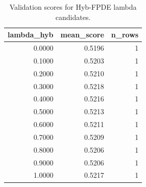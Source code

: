\begin{table}[t]
\caption{Validation scores for Hyb-FPDE lambda candidates.}
\label{tab:lambda_distribution_computed}
\centering
\begin{tabular}{rrr}
\toprule
lambda\_hyb & mean\_score & n\_rows \\
\midrule
0.0000 & 0.5196 & 1 \\
0.1000 & 0.5203 & 1 \\
0.2000 & 0.5210 & 1 \\
0.3000 & 0.5218 & 1 \\
0.4000 & 0.5216 & 1 \\
0.5000 & 0.5213 & 1 \\
0.6000 & 0.5211 & 1 \\
0.7000 & 0.5209 & 1 \\
0.8000 & 0.5206 & 1 \\
0.9000 & 0.5206 & 1 \\
1.0000 & 0.5217 & 1 \\
\bottomrule
\end{tabular}

\end{table}
